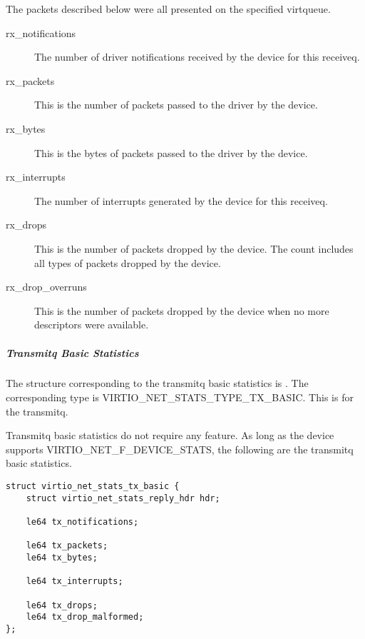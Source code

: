 The packets described below were all presented on the specified virtqueue.
\begin{description}
    \item [rx_notifications]
        The number of driver notifications received by the device for this
        receiveq.

    \item [rx_packets]
        This is the number of packets passed to the driver by the device.

    \item [rx_bytes]
        This is the bytes of packets passed to the driver by the device.

    \item [rx_interrupts]
        The number of interrupts generated by the device for this receiveq.

    \item [rx_drops]
        This is the number of packets dropped by the device. The count includes
        all types of packets dropped by the device.

    \item [rx_drop_overruns]
        This is the number of packets dropped by the device when no more
        descriptors were available.

\end{description}

\subparagraph{Transmitq Basic Statistics}\label{sec:Device Types / Network Device / Device Operation / Control Virtqueue / Device Statistics / Transmitq Basic Statistics}

The structure corresponding to the transmitq basic statistics is
. The corresponding type is
VIRTIO_NET_STATS_TYPE_TX_BASIC. This is for the transmitq.

Transmitq basic statistics do not require any feature. As long as the device supports
VIRTIO_NET_F_DEVICE_STATS, the following are the transmitq basic statistics.

\begin{lstlisting}
struct virtio_net_stats_tx_basic {
    struct virtio_net_stats_reply_hdr hdr;

    le64 tx_notifications;

    le64 tx_packets;
    le64 tx_bytes;

    le64 tx_interrupts;

    le64 tx_drops;
    le64 tx_drop_malformed;
};
\end{lstlisting}

